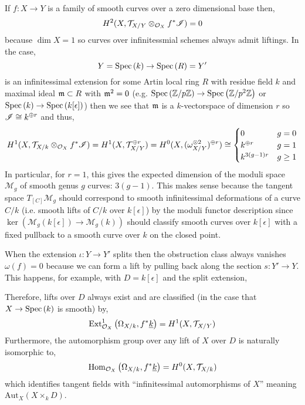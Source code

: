 \documentclass[12pt]{article}
\begin{document}
\begin{example}
If $f : X \to Y$ is a family of smooth curves over a zero dimensional base then, 
\[ H^2(X, \mathcal{T}_{X/Y} \otimes_{\mathcal{O}_{X}} f^* \mathscr{I}) = 0 \]
because $\dim{X} = 1$ so curves over infinitessmial schemes always admit liftings. In the case,
\[ Y = \mathrm{Spec}\left( k \right) \to \mathrm{Spec}\left( R \right) = Y' \]
is an infinitessimal extension for some Artin local ring $R$ with residue field $k$ and maximal ideal $\mathfrak{m} \subset R$ with $\mathfrak{m}^2 = 0$ (e.g. $\mathrm{Spec}\left( \mathbb{Z}/p\mathbb{Z} \right) \to \mathrm{Spec}\left( \mathbb{Z}/p^2\mathbb{Z} \right)$ or $\mathrm{Spec}\left( k \right) \to \mathrm{Spec}\left( k[\epsilon] \right)$) then we see that $\mathfrak{m}$ is a $k$-vectorspace of dimension $r$ so $\mathscr{I} \cong k^{\oplus r}$ and thus,
\[ H^1(X, \mathcal{T}_{X/k} \otimes_{\mathcal{O}_{X}} f^* \mathscr{I}) = H^1(X, \mathcal{T}_{X/Y}^{\oplus r}) = H^0(X, (\omega_{X/Y}^{\otimes 2})^{\oplus r}) \cong 
\begin{cases}
0 & g = 0
\\
k^{\oplus r} & g = 1
\\
k^{3(g-1)r} & g \ge 1 
\end{cases} \]
In particular, for $r = 1$, this gives the expected dimension of the moduli space $\mathcal{M}_g$ of smooth genus $g$ curves: $3(g-1)$. This makes sense because the tangent space $T_{[C]} \mathcal{M}_g$ should correspond to smooth infinitessimal deformations of a curve $C/k$ (i.e. smooth lifts of $C/k$ over $k[\epsilon]$) by the moduli functor description since $\ker{(\mathcal{M}_g(k[\epsilon]) \to \mathcal{M}_g(k))}$ should classify smooth curves over $k[\epsilon]$ with a fixed pullback to a smooth curve over $k$ on the closed point.
\end{example}

\begin{example}
When the extension $\iota : Y \to Y'$ splits then the obstruction class always vanishes $\omega(f) = 0$ because we can form a lift by pulling back along the section $s : Y' \to Y$. This happens, for example, with $D = k[\epsilon]$ and the split extension,
\begin{center}
\end{center}
Therefore, lifts over $D$ always exist and are classified (in the case that $X \to \mathrm{Spec}\left( k \right)$ is smooth) by,
\[ \mathrm{Ext}^{1}_{\mathcal{O}_{X}} \left( \Omega_{X/k}, f^* \underline{k} \right) = H^1(X, \mathcal{T}_{X/Y}) \]
Furthermore, the automorphism group over any lift of $X$ over $D$ is naturally isomorphic to,
\[ \mathrm{Hom}_{\mathcal{O}_{X}} \left( \Omega_{X/k}, f^* \underline{k} \right) = H^0(X, \mathcal{T}_{X/k}) \]
which identifies tangent fields with ``infinitessimal automorphisms of $X$'' meaning $\mathrm{Aut}_X(X \times_k D)$.
\end{example}
\end{document}
